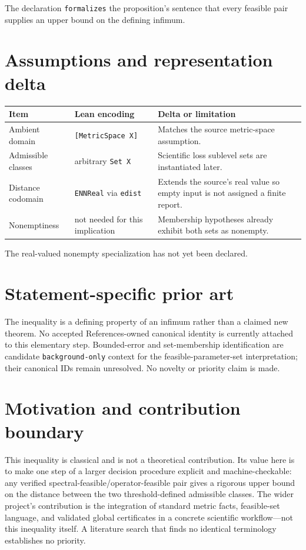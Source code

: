 \documentclass[11pt]{article}
\begin{document}
The declaration \texttt{formalizes} the proposition's sentence that every feasible pair
supplies an upper bound on the defining infimum.

\section{Assumptions and representation delta}

\begin{tabularx}{\textwidth}{@{}lXX@{}}
\toprule
Item & Lean encoding & Delta or limitation \\
\midrule
Ambient domain & \texttt{[MetricSpace X]} & Matches the source metric-space assumption. \\
Admissible classes & arbitrary \texttt{Set X} & Scientific loss sublevel sets are instantiated later. \\
Distance codomain & \texttt{ENNReal} via \texttt{edist} & Extends the source's real value so empty input is not assigned a finite report. \\
Nonemptiness & not needed for this implication & Membership hypotheses already exhibit both sets as nonempty. \\
\bottomrule
\end{tabularx}

The real-valued nonempty specialization has not yet been declared.

\section{Statement-specific prior art}

The inequality is a defining property of an infimum rather than a claimed new theorem.
No accepted References-owned canonical identity is currently attached to this elementary
step. Bounded-error and set-membership identification are candidate
\texttt{background-only} context for the feasible-parameter-set interpretation; their
canonical IDs remain unresolved. No novelty or priority claim is made.

\section{Motivation and contribution boundary}

This inequality is classical and is not a theoretical contribution. Its value here is to
make one step of a larger decision procedure explicit and machine-checkable: any verified
spectral-feasible/operator-feasible pair gives a rigorous upper bound on the distance
between the two threshold-defined admissible classes. The wider project's contribution is the integration of standard metric facts,
feasible-set language, and validated global certificates in a concrete scientific
workflow—not this inequality itself. A literature search that finds no identical
terminology establishes no priority.
\end{document}
